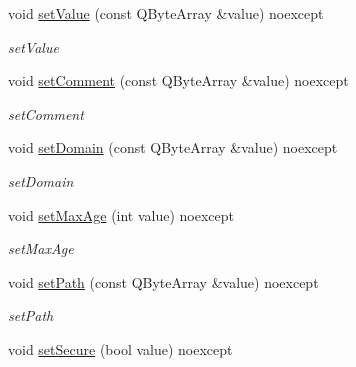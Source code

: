 \begin{DoxyCompactItemize}
\mbox{\label{class_http_cookie_a7bb2be880561c06f961cda75ed200601}} 
void \hyperlink{class_http_cookie_a7bb2be880561c06f961cda75ed200601}{set\+Value} (const Q\+Byte\+Array \&value) noexcept
\begin{DoxyCompactList}\small\item\em set\+Value \end{DoxyCompactList}\item 
\mbox{\label{class_http_cookie_a728428f4220ba6678fdbfc225f65ab89}} 
void \hyperlink{class_http_cookie_a728428f4220ba6678fdbfc225f65ab89}{set\+Comment} (const Q\+Byte\+Array \&value) noexcept
\begin{DoxyCompactList}\small\item\em set\+Comment \end{DoxyCompactList}\item 
\mbox{\label{class_http_cookie_a00a6d505032b46606cbe6e573977f686}} 
void \hyperlink{class_http_cookie_a00a6d505032b46606cbe6e573977f686}{set\+Domain} (const Q\+Byte\+Array \&value) noexcept
\begin{DoxyCompactList}\small\item\em set\+Domain \end{DoxyCompactList}\item 
\mbox{\label{class_http_cookie_a829662d2cc5a445c718217c2651a31ea}} 
void \hyperlink{class_http_cookie_a829662d2cc5a445c718217c2651a31ea}{set\+Max\+Age} (int value) noexcept
\begin{DoxyCompactList}\small\item\em set\+Max\+Age \end{DoxyCompactList}\item 
\mbox{\label{class_http_cookie_acdb116a430353e45a95435d8debd5632}} 
void \hyperlink{class_http_cookie_acdb116a430353e45a95435d8debd5632}{set\+Path} (const Q\+Byte\+Array \&value) noexcept
\begin{DoxyCompactList}\small\item\em set\+Path \end{DoxyCompactList}\item 
\mbox{\label{class_http_cookie_ab1caa7eca962c497e765c46523d4747e}} 
void \hyperlink{class_http_cookie_ab1caa7eca962c497e765c46523d4747e}{set\+Secure} (bool value) noexcept

\end{DoxyCompactItemize}
